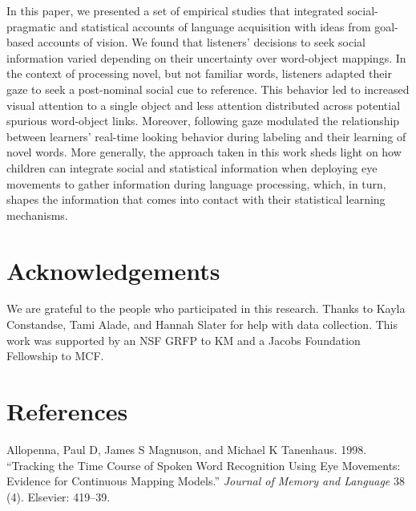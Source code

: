 \documentclass[10pt, letterpaper]{article}
\begin{document}
In this paper, we presented a set of empirical studies that integrated
social-pragmatic and statistical accounts of language acquisition with
ideas from goal-based accounts of vision. We found that listeners'
decisions to seek social information varied depending on their
uncertainty over word-object mappings. In the context of processing
novel, but not familiar words, listeners adapted their gaze to seek a
post-nominal social cue to reference. This behavior led to increased
visual attention to a single object and less attention distributed
across potential spurious word-object links. Moreover, following gaze
modulated the relationship between learners' real-time looking behavior
during labeling and their learning of novel words. More generally, the
approach taken in this work sheds light on how children can integrate
social and statistical information when deploying eye movements to
gather information during language processing, which, in turn, shapes
the information that comes into contact with their statistical learning
mechanisms.

\vspace{1em}

\vspace{1em}

\hypertarget{acknowledgements}{%
\section{Acknowledgements}\label{acknowledgements}}

We are grateful to the people who participated in this research. Thanks
to Kayla Constandse, Tami Alade, and Hannah Slater for help with data
collection. This work was supported by an NSF GRFP to KM and a Jacobs
Foundation Fellowship to MCF.

\hypertarget{references}{%
\section{References}\label{references}}

\setlength{\parindent}{-0.1in} 
\setlength{\leftskip}{0.125in}

\noindent

\hypertarget{refs}{}
\leavevmode\hypertarget{ref-allopenna1998tracking}{}%
Allopenna, Paul D, James S Magnuson, and Michael K Tanenhaus. 1998.
``Tracking the Time Course of Spoken Word Recognition Using Eye
Movements: Evidence for Continuous Mapping Models.'' \emph{Journal of
Memory and Language} 38 (4). Elsevier: 419--39.
\end{document}
